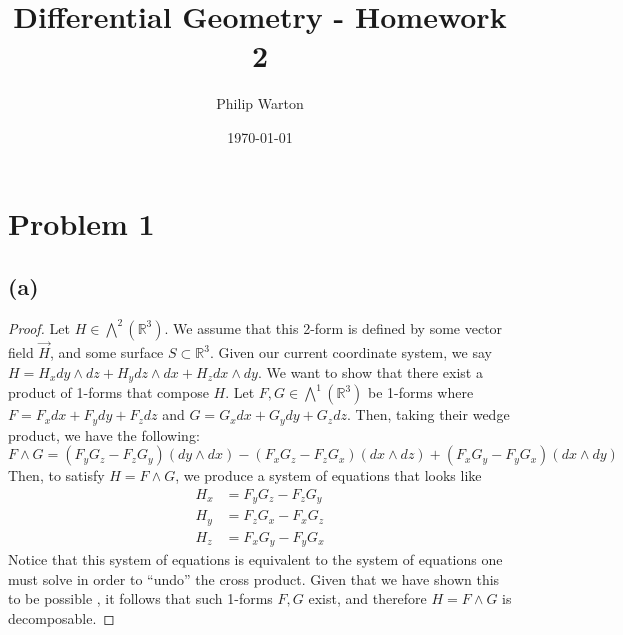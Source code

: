 \documentclass{article}
\theoremstyle{definition}
\begin{document}
\title{Differential Geometry - Homework 2}
\author{Philip Warton}
\date{\today}
\maketitle
\section*{Problem 1}
\subsection*{(a)}
\begin{proof}
    Let $H \in \bigwedge^2(\mathbb{R}^3)$.
    We assume that this 2-form is defined by some vector field $\vec{H}$, and some surface $S \subset \mathbb{R}^3$.
    Given our current coordinate system, we say $H = H_x dy \wedge dz + H_y dz \wedge dx + H_z dx \wedge dy$.
    We want to show that there exist a product of 1-forms that compose $H$. Let $F, G \in \bigwedge^1(\mathbb{R}^3)$
    be 1-forms where $F = F_xdx + F_ydy + F_zdz$ and $G = G_xdx + G_ydy + G_zdz$. Then, taking their wedge product, 
    we have the following:
    \[
        F \wedge G = (F_yG_z - F_z G_y)(dy \wedge dx) - (F_xG_z - F_zG_x)(dx \wedge dz) + (F_xG_y - F_yG_x)(dx \wedge dy)
    \]
    Then, to satisfy $H = F \wedge G$, we produce a system of equations that looks like
    \begin{align}
        H_x &= F_yG_z - F_zG_y \\
        H_y &= F_zG_x - F_xG_z \\
        H_z &= F_xG_y - F_yG_x
    \end{align}
    Notice that this system of equations is equivalent to the system of equations one must solve in order to ``undo'' the
    cross product. Given that we have shown this to be possible , it follows that such 1-forms $F,G$
    exist, and therefore $H = F \wedge G$ is decomposable.
\end{proof}
\end{document}
